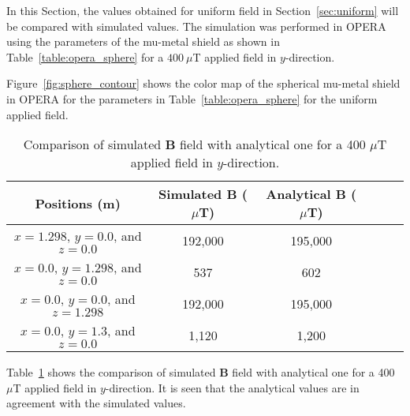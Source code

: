 In this Section, the values obtained for uniform field in Section~\ref{sec:uniform} will be compared with simulated values. The simulation was performed in OPERA using the parameters of the mu-metal shield as shown in Table~\ref{table:opera_sphere} for a $400~\mu$T applied field in $y$-direction.

\FloatBarrier


Figure~\ref{fig:sphere_contour} shows the color map of the spherical mu-metal shield in OPERA for the parameters in Table~\ref{table:opera_sphere} for the uniform applied field.



\begin{table} [tb!]
    \centering
    \begin{tabular} { |c|c|c|c|c|c|} 
        \hline
        Positions (m) & Simulated $\bm{B}$ ($\mu$T) & Analytical $\bm{B}$ ($\mu$T)\\
        \hline\hline
        $x=1.298$, $y=0.0$, and $z=0.0$ & 192,000 & 195,000\\ 
        \hline
        $x=0.0$, $y=1.298$, and $z=0.0$ & 537 & 602\\ 
        \hline
        $x=0.0$, $y=0.0$, and $z=1.298$ & 192,000 & 195,000\\ 
        \hline
        $x=0.0$, $y=1.3$, and $z=0.0$ & 1,120 & 1,200\\ 
        \hline

    \end{tabular}
    \caption[Comparison of simulated $\bm{B}$ field with analytical one ]{Comparison of simulated $\bm{B}$ field with analytical one for a 400 $\mu$T applied field in $y$-direction.}\label{table:opera_analytical}
\end{table}

\FloatBarrier

Table~\ref{table:opera_analytical} shows the comparison of simulated $\bm{B}$ field with analytical one for a 400 $\mu$T applied field in $y$-direction. It is seen that the analytical values are in agreement with the simulated values.